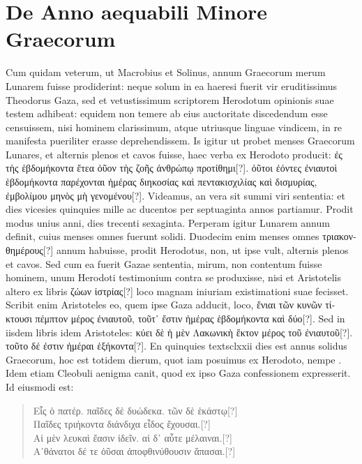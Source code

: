 \section{De Anno aequabili Minore Graecorum}
Cum quidam veterum, ut Macrobius et Solinus, annum Graecorum
merum Lunarem fuisse prodiderint:
neque solum in ea
haeresi fuerit vir eruditissimus Theodorus Gaza, sed et vetustissimum
scriptorem Herodotum opinionis suae testem adhibeat:
equidem non
temere ab eius auctoritate discedendum esse censuissem, nisi hominem
clarissimum, atque utriusque linguae vindicem, in re manifesta
pueriliter erasse deprehendissem.
%
Is igitur ut probet menses Graecorum
Lunares, et alternis plenos et cavos fuisse, haec verba ex Herodoto
producit: \textgreek{ἐς τὴς ἑβδομήκοντα ἔτεα ὀῦον τὴς ζοῆς ἀνθρώπῳ προτίθημι[?]}.
\textgreek{ὀῦτοι
ἐόντες ἐνιαυτοὶ ἑβδομήκοντα παρέχονται ἡμέρας διηκοσίας καὶ πεντακισχιλίας καὶ
δισμυρίας, ἐμβολίμου μηνὸς μὴ γενομένου[?]}.
Videamus, an vera sit summi
viri sententia: et dies vicesies quinquies mille ac ducentos per septuaginta
annos partiamur.
Prodit modus unius anni, dies trecenti sexaginta.
Perperam igitur Lunarem annum definit, cuius menses omnes
fuerunt solidi.
Duodecim enim menses omnes \textgreek{τριακονθημέρους[?]}
annum habuisse, prodit Herodotus, non, ut ipse vult, alternis plenos
et cavos.
Sed cum ea fuerit Gazae sententia, mirum, non contentum
fuisse hominem, unum Herodoti testimonium contra se produxisse,
nisi et Aristotelis altero ex libris \textgreek{ζώων ἱστρίας[?]}
 loco magnam iniuriam
existimationi suae fecisset.
Scribit enim Aristoteles eo, quem ipse
Gaza adducit, loco,
 \textgreek{ἔνιαι τῶν κυνῶν τίκτουσι πέμπτον μέρος ἐνιαυτοῦ, τοῦτ᾽ ἔστιν
ἡμέρας ἑβδομήκοντα καὶ δύο[?]}.
Sed in iisdem libris idem Aristoteles: \textgreek{κύει δὲ
ἡ μὲν Λακωνικὴ ἕκτον μέρος τοῦ ἐνιαυτοῦ[?]}.
\textgreek{τοῦτο δέ ἐστιν ἡμέραι ἑξήκοντα[?]}.
En quinquies
textsc{lxxii} dies est annus solidus Graecorum, hoc est totidem dierum,
quot iam posuimus ex Herodoto, nempe .
Idem etiam Cleobuli
aenigma canit, quod ex ipso Gaza confessionem expresserit.
Id eiusmodi
est:
\begin{verse}
\textgreek{Εἷς ὁ πατέρ. παῖδες δὲ δυώδεκα. τῶν δὲ ἑκάστῳ[?]}\\
\textgreek{Παῖδες τριήκοντα διάνδιχα εἶδος ἔχουσαι.[?]}\\
\textgreek{Αἱ μὲν λευκαὶ ἔασιν ἰδεῖν. αἱ δ᾽ αὖτε μέλαιναι.[?]}\\
\textgreek{Α᾽θάνατοι δέ τε ὀῦσαι ἀποφθινύθουσιν ἅπασαι.[?]}
\end{verse}

